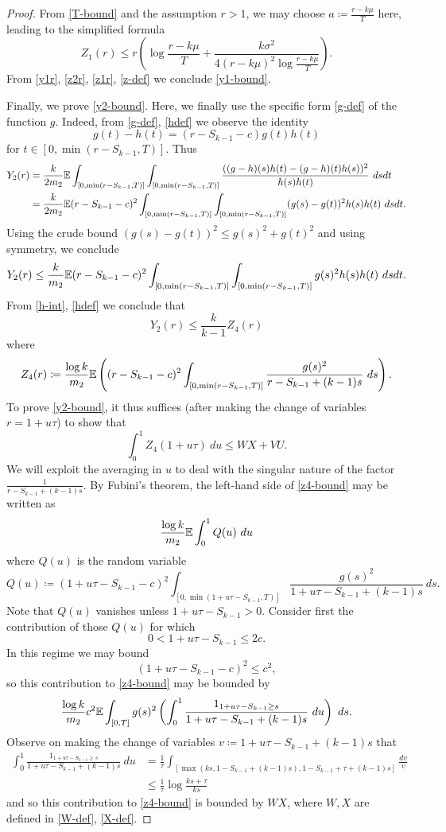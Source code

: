\begin{proof}
From \eqref{T-bound} and the assumption $r > 1$, we may choose $a \coloneqq \frac{r-k\mu}{T}$ here, leading to the simplified formula
\begin{equation}\label{z1r}
Z_1(r) \leq r \left( \log \frac{r-k\mu}{T} + \frac{k\sigma^2}{4(r-k\mu)^2 \log \frac{r-k\mu}{T}}\right).
\end{equation}
From \eqref{y1r}, \eqref{z2r}, \eqref{z1r}, \eqref{z-def} we conclude \eqref{y1-bound}.

Finally, we prove \eqref{y2-bound}.  Here, we finally use the specific form \eqref{g-def} of the function $g$.  Indeed, from \eqref{g-def}, \eqref{hdef} we observe the identity
$$ g(t) - h(t) = (r - S_{k-1} - c) g(t) h(t)$$
for $t \in [0, \min(r-S_{k-1},T)]$.  Thus
\begin{align*}
Y_2(r) &= \frac{k}{2 m_2} \mathbb{E} \int_{[0,\min(r-S_{k-1},T)]} \int_{[0,\min(r-S_{k-1},T)]} \frac{((g-h)(s) h(t)-(g-h)(t) h(s))^2}{h(s) h(t)}\ ds dt \\
&= \frac{k}{2 m_2} \mathbb{E} (r - S_{k-1} - c)^2 \int_{[0,\min(r-S_{k-1},T)]} \int_{[0,\min(r-S_{k-1},T)]} (g(s)-g(t))^2 h(s) h(t)\ ds dt.
\end{align*}
Using the crude bound $(g(s)-g(t))^2 \leq g(s)^2+g(t)^2$ and using symmetry, we conclude
$$Y_2(r) \leq \frac{k}{m_2} \mathbb{E} (r - S_{k-1} - c)^2 \int_{[0,\min(r-S_{k-1},T)]} \int_{[0,\min(r-S_{k-1},T)]} g(s)^2 h(s) h(t)\ ds dt.$$
From \eqref{h-int}, \eqref{hdef} we conclude that
$$ Y_2(r) \leq \frac{k}{k-1} Z_4(r)$$
where
$$ Z_4(r) \coloneqq \frac{\log k}{m_2} \mathbb{E}\left( (r - S_{k-1} - c)^2 \int_{[0,\min(r-S_{k-1},T)]} \frac{g(s)^2}{r-S_{k-1}+(k-1)s}\ ds \right) .$$
To prove \eqref{y2-bound}, it thus suffices (after making the change of variables $r = 1 + u \tau$) to show that
\begin{equation}\label{z4-bound}
 \int_0^1 Z_4(1+u\tau)\ du \leq WX+VU.
\end{equation}
We will exploit the averaging in $u$ to deal with the singular nature of the factor $\frac{1}{r-S_{k-1}+(k-1)s}$.  By Fubini's theorem, the left-hand side of \eqref{z4-bound} may be written as
$$ \frac{\log k}{m_2} \mathbb{E} \int_0^1 Q(u)\ du $$
where $Q(u)$ is the random variable
$$ Q(u) \coloneqq (1+u\tau - S_{k-1} - c)^2 \int_{[0,\min(1+u\tau-S_{k-1},T)]} \frac{g(s)^2}{1+u\tau-S_{k-1}+(k-1)s}\ ds.$$
Note that $Q(u)$ vanishes unless $1+u\tau-S_{k-1} > 0$.  Consider first the contribution of those $Q(u)$ for which
$$ 0 < 1+u\tau-S_{k-1} \leq 2c.$$
In this regime we may bound
$$ (1+u\tau-S_{k-1}-c)^2 \leq c^2,$$
so this contribution to \eqref{z4-bound} may be bounded by
$$ \frac{\log k}{m_2} c^2 \mathbb{E} \int_{[0,T]} g(s)^2 \left(\int_0^1 \frac{1_{1+u\tau-S_{k-1} \geq s}}{1+u\tau-S_{k-1}+(k-1)s}\ du\right)\ ds.$$
Observe on making the change of variables $v \coloneqq 1 + u\tau - S_{k-1} + (k-1)s$ that 
\begin{align*}
\int_0^1 \frac{1_{1+u\tau-S_{k-1} \geq s}}{1+u\tau-S_{k-1}+(k-1)s}\ du &= \frac{1}{\tau} \int_{[\max(ks, 1-S_{k-1}+(k-1)s), 1-S_{k-1}+\tau+(k-1)s]} \frac{dv}{v} \\
&\leq \frac{1}{\tau} \log \frac{ks+\tau}{ks}
\end{align*}
and so this contribution to \eqref{z4-bound} is bounded by $WX$, where $W,X$ are defined in \eqref{W-def}, \eqref{X-def}.


\end{proof}
